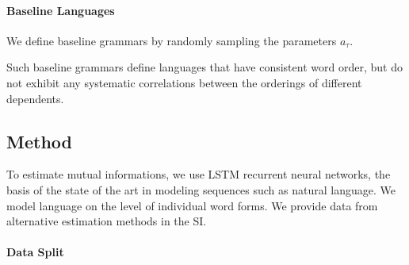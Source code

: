 \documentclass[11pt,letterpaper]{article}
\begin{document}
\paragraph{Baseline Languages}
We define baseline grammars by randomly sampling the parameters $a_\tau$.

Such baseline grammars define languages that have consistent word order, but do not exhibit any systematic correlations between the orderings of different dependents.



\subsection{Method}
%
%
%
%
%
%
%
%
%
%

To estimate mutual informations, we use LSTM recurrent neural networks, the basis of the state of the art in modeling sequences such as natural language.
We model language on the level of individual word forms.
We provide data from alternative estimation methods in the SI.


\paragraph{Data Split}
\end{document}
